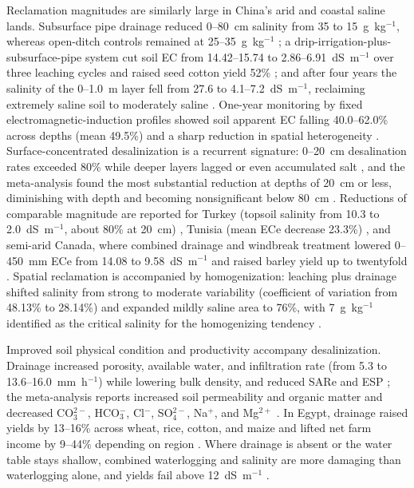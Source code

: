 \documentclass[11pt]{article}
\begin{document}
Reclamation magnitudes are similarly large in China's arid and coastal saline lands. Subsurface pipe drainage reduced 0--80~cm salinity from 35 to 15~g~kg$^{-1}$, whereas open-ditch controls remained at 25--35~g~kg$^{-1}$ \parencite{Wang2020}; a drip-irrigation-plus-subsurface-pipe system cut soil EC from 14.42--15.74 to 2.86--6.91~dS~m$^{-1}$ over three leaching cycles and raised seed cotton yield 52\% \parencite{Heng2021}; and after four years the salinity of the 0--1.0~m layer fell from 27.6 to 4.1--7.2~dS~m$^{-1}$, reclaiming extremely saline soil to moderately saline \parencite{Zhang2021}. One-year monitoring by fixed electromagnetic-induction profiles showed soil apparent EC falling 40.0--62.0\% across depths (mean 49.5\%) and a sharp reduction in spatial heterogeneity \parencite{Yu2025}. Surface-concentrated desalinization is a recurrent signature: 0--20~cm desalination rates exceeded 80\% while deeper layers lagged or even accumulated salt \parencite{Han2023}, and the meta-analysis found the most substantial reduction at depths of 20~cm or less, diminishing with depth and becoming nonsignificant below 80~cm \parencite{Yang2025}. Reductions of comparable magnitude are reported for Turkey (topsoil salinity from 10.3 to 2.0~dS~m$^{-1}$, about 80\% at 20~cm) \parencite{Bahçeci2009}, Tunisia (mean ECe decrease 23.3\%) \parencite{HajAmor2019}, and semi-arid Canada, where combined drainage and windbreak treatment lowered 0--450~mm ECe from 14.08 to 9.58~dS~m$^{-1}$ and raised barley yield up to twentyfold \parencite{Steppuhn2006,Steppuhn2017}. Spatial reclamation is accompanied by homogenization: leaching plus drainage shifted salinity from strong to moderate variability (coefficient of variation from 48.13\% to 28.14\%) and expanded mildly saline area to 76\%, with 7~g~kg$^{-1}$ identified as the critical salinity for the homogenizing tendency \parencite{Yu2015}.

Improved soil physical condition and productivity accompany desalinization. Drainage increased porosity, available water, and infiltration rate (from 5.3 to 13.6--16.0~mm~h$^{-1}$) while lowering bulk density, and reduced SARe and ESP \parencite{Sharma2000}; the meta-analysis reports increased soil permeability and organic matter and decreased CO$_3^{2-}$, HCO$_3^-$, Cl$^-$, SO$_4^{2-}$, Na$^+$, and Mg$^{2+}$ \parencite{Yang2025}. In Egypt, drainage raised yields by 13--16\% across wheat, rice, cotton, and maize and lifted net farm income by 9--44\% depending on region \parencite{Kotb2000}. Where drainage is absent or the water table stays shallow, combined waterlogging and salinity are more damaging than waterlogging alone, and yields fail above 12~dS~m$^{-1}$ \parencite{Kahlown2002}.
\end{document}
